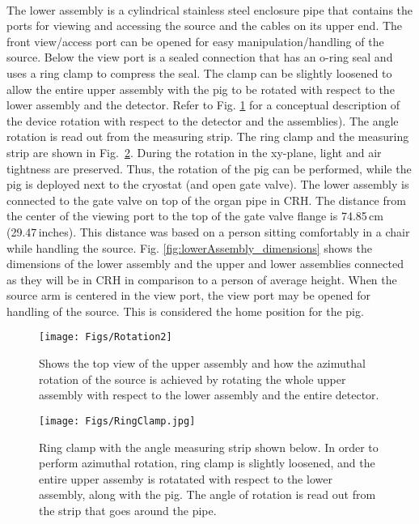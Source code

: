  \paragraph{}
    The lower assembly is a cylindrical stainless steel enclosure pipe that contains the ports for viewing and accessing the source and the cables on its upper end. The front view/access port can be opened for easy manipulation/handling of the source. Below the view port is a sealed connection that has an o-ring seal and uses a ring clamp to compress the seal. The clamp can be slightly loosened to allow the entire upper assembly with the pig to be rotated with respect to the lower assembly and the detector. Refer to Fig. \ref{fig:Rotation2} for a conceptual description of the device rotation with respect to the detector and the assemblies). The angle rotation is read out from the measuring strip. The ring clamp and the measuring strip are shown in Fig.~\ref{fig:ring_clamp}. During the rotation in the xy-plane, light and air tightness are preserved. Thus, the rotation of the pig can be performed, while the pig is deployed next to the cryostat (and open  gate valve).  The lower assembly is connected to the gate valve on top of the organ pipe in CRH.  The distance from the center of the viewing port to the top of the gate valve flange is 74.85\,cm (29.47\,inches). This distance was based on a person sitting comfortably in a chair while handling the source.  Fig. \ref{fig:lowerAssembly_dimensions} shows the dimensions of the lower assembly and the upper and lower assemblies connected as they will be in CRH in comparison to a person of average height.   When the source arm is centered in the view port, the view port may be opened for handling of the source.  This is considered the home position for the pig.  

\begin{figure}[htbp]
 \centering
  \texttt{[image: Figs/Rotation2]}
   \caption{Shows the top view of the upper assembly and how the azimuthal rotation of the source is achieved by rotating the whole upper assembly with respect to the lower assembly and the entire detector.}
  \label{fig:Rotation2}
 \end{figure}

\begin{figure}[htbp]
 \centering
  \texttt{[image: Figs/RingClamp.jpg]}
  \caption{Ring clamp  with the angle measuring strip shown below. In order to perform azimuthal rotation, ring clamp is slightly loosened, and the entire upper assemby is rotatated with respect to the lower assembly, along with the pig. The angle of rotation is read out from the strip that goes around the pipe. }
  \label{fig:ring_clamp}
\end{figure} 
	

